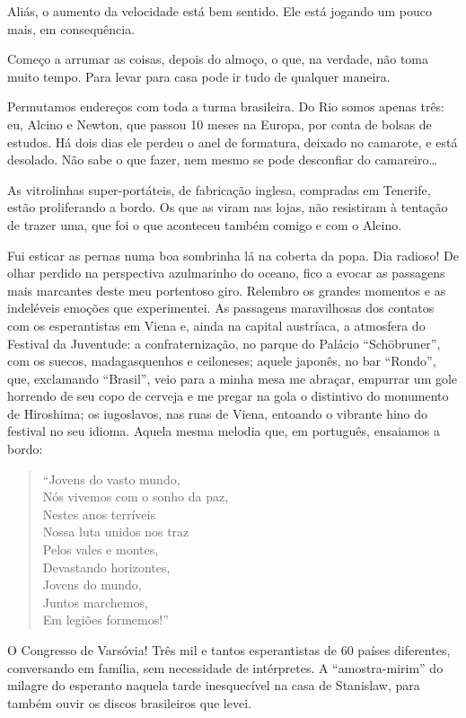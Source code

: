 Aliás, o aumento da velocidade está bem sentido. Ele está jogando um pouco mais, em consequência.

Começo a arrumar as coisas, depois do almoço, o que, na verdade, não toma muito tempo. Para levar para casa pode ir tudo de qualquer maneira.

Permutamos endereços com toda a turma brasileira. Do Rio somos apenas três: eu, Alcino e Newton, que passou 10 meses na Europa, por conta de bolsas de estudos. Há dois dias ele perdeu o anel de formatura, deixado no camarote, e está desolado. Não sabe o que fazer, nem mesmo se pode desconfiar do camareiro\ldots

As vitrolinhas super-portáteis, de fabricação inglesa, compradas em Tenerife, estão proliferando a bordo. Os que as viram nas lojas, não resistiram à tentação de trazer uma, que foi o que aconteceu também comigo e com o Alcino.

Fui esticar as pernas numa boa sombrinha lá na coberta da popa. Dia radioso! De olhar perdido na perspectiva azulmarinho do oceano, fico a evocar as passagens mais marcantes deste meu portentoso giro. Relembro os grandes momentos e as indeléveis emoções que experimentei. As passagens maravilhosas dos contatos com os esperantistas em Viena e, ainda na capital austríaca, a atmosfera do Festival da Juventude: a confraternização, no parque do Palácio “Schöbruner”, com os suecos, madagasquenhos e ceiloneses; aquele japonês, no bar “Rondo”, que, exclamando “Brasil”, veio para a minha mesa me abraçar, empurrar um gole horrendo de seu copo de cerveja e me pregar na gola o distintivo do monumento de Hiroshima; os iugoslavos, nas ruas de Viena, entoando o vibrante hino do festival no seu idioma. Aquela mesma melodia que, em português, ensaiamos a bordo:

\begin{verse}
``Jovens do vasto mundo,\\
Nós vivemos com o sonho da paz,\\
Nestes anos terríveis\\
Nossa luta unidos nos traz\\
Pelos vales e montes,\\
Devastando horizontes,\\
Jovens do mundo,\\
Juntos marchemos,\\
Em legiões formemos!''
\end{verse}

O Congresso de Varsóvia! Três mil e tantos esperantistas de 60 países diferentes, conversando em família, sem necessidade de intérpretes. A “amostra-mirim” do milagre do esperanto naquela tarde inesquecível na casa de Stanislaw, para também ouvir os discos brasileiros que levei.

